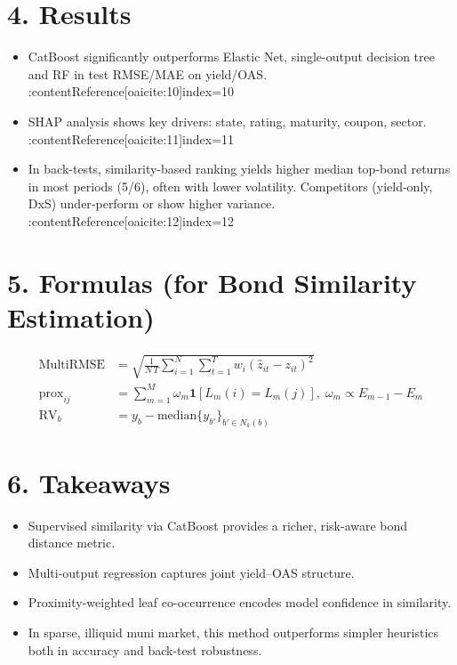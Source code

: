 \documentclass{article}
\begin{document}
\section*{4. Results}
\begin{itemize}
  \item CatBoost significantly outperforms Elastic Net, single-output decision tree and RF in test RMSE/MAE on yield/OAS. :contentReference[oaicite:10]{index=10}
  \item SHAP analysis shows key drivers: state, rating, maturity, coupon, sector. :contentReference[oaicite:11]{index=11}
  \item In back-tests, similarity-based ranking yields higher median top‑bond returns in most periods (5/6), often with lower volatility. Competitors (yield‐only, DxS) under‐perform or show higher variance. :contentReference[oaicite:12]{index=12}
\end{itemize}

\section*{5. Formulas (for Bond Similarity Estimation)}

\begin{align*}
\text{MultiRMSE} &= \sqrt{\frac{1}{N\,T} \sum_{i=1}^N \sum_{t=1}^T w_i (\hat z_{it} - z_{it})^2}\\
\text{prox}_{ij} &= \sum_{m=1}^M \omega_m \mathbf{1}[L_m(i) = L_m(j)], \; \omega_m\propto E_{m-1}-E_{m}\\
\text{RV}_b &= y_b - \mathrm{median}\{y_{b'}\}_{b'\in N_k(b)}
\end{align*}

\section*{6. Takeaways}
\begin{itemize}
  \item Supervised similarity via CatBoost provides a richer, risk-aware bond distance metric.
  \item Multi-output regression captures joint yield–OAS structure.
  \item Proximity-weighted leaf co-occurrence encodes model confidence in similarity.
  \item In sparse, illiquid muni market, this method outperforms simpler heuristics both in accuracy and back-test robustness.
\end{itemize}
\end{document}
